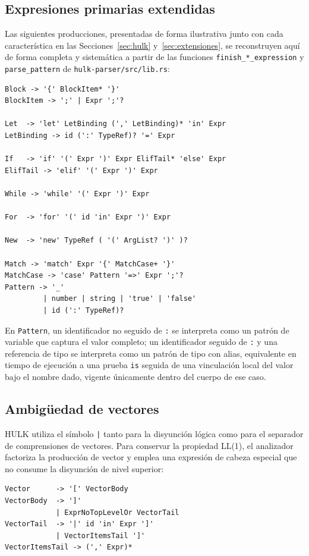 \documentclass[12pt, a4paper]{article}
\begin{document}
\subsection{Expresiones primarias extendidas}

Las siguientes producciones, presentadas de forma ilustrativa junto con cada
característica en las Secciones~\ref{sec:hulk} y~\ref{sec:extensiones}, se
reconstruyen aquí de forma completa y sistemática a partir de las funciones
\texttt{finish\_*\_expression} y \texttt{parse\_pattern} de
\texttt{hulk-parser/src/lib.rs}:

\begin{lstlisting}[language={}]
Block -> '{' BlockItem* '}'
BlockItem -> ';' | Expr ';'?

Let  -> 'let' LetBinding (',' LetBinding)* 'in' Expr
LetBinding -> id (':' TypeRef)? '=' Expr

If   -> 'if' '(' Expr ')' Expr ElifTail* 'else' Expr
ElifTail -> 'elif' '(' Expr ')' Expr

While -> 'while' '(' Expr ')' Expr

For  -> 'for' '(' id 'in' Expr ')' Expr

New  -> 'new' TypeRef ( '(' ArgList? ')' )?

Match -> 'match' Expr '{' MatchCase+ '}'
MatchCase -> 'case' Pattern '=>' Expr ';'?
Pattern -> '_'
         | number | string | 'true' | 'false'
         | id (':' TypeRef)?
\end{lstlisting}

En \texttt{Pattern}, un identificador no seguido de \texttt{:} se interpreta
como un patrón de variable que captura el valor completo; un identificador
seguido de \texttt{:} y una referencia de tipo se interpreta como un patrón de
tipo con alias, equivalente en tiempo de ejecución a una prueba \texttt{is}
seguida de una vinculación local del valor bajo el nombre dado, vigente
únicamente dentro del cuerpo de ese caso.

\subsection{Ambigüedad de vectores}

HULK utiliza el símbolo \texttt{|} tanto para la disyunción lógica como para
el separador de comprensiones de vectores. Para conservar la propiedad LL(1),
el analizador factoriza la producción de vector y emplea una expresión de
cabeza especial que no consume la disyunción de nivel superior:

\begin{lstlisting}[language={}]
Vector      -> '[' VectorBody
VectorBody  -> ']'
            | ExprNoTopLevelOr VectorTail
VectorTail  -> '|' id 'in' Expr ']'
            | VectorItemsTail ']'
VectorItemsTail -> (',' Expr)*
\end{lstlisting}
\end{document}
